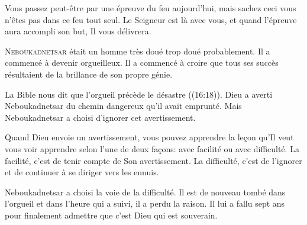 Vous passez peut-être par une épreuve du feu aujourd'hui, mais sachez ceci
 \ocadr vous n'êtes pas dans ce feu tout seul.
 Le Seigneur est là avec vous, et quand l'épreuve aura accompli son but,
 Il vous délivrera. 

\dvrule







\lettrine{N}{eboukadnetsar} était un homme très doué
 \ocadr trop doué probablement. Il a commencé à devenir orgueilleux.
 Il a commencé à croire que tous ses succès résultaient de la brillance
 de son propre génie. 

La Bible nous dit que \Og l'orgueil précède le désastre \Fg{}
 ((16:18)).
 Dieu a averti Neboukadnetsar du chemin dangereux qu'il avait emprunté.
 Mais Neboukadnetsar a choisi d'ignorer cet avertissement. 


Quand Dieu envoie un avertissement,
 vous pouvez apprendre la le\c{c}on
 qu'Il veut vous voir apprendre selon l'une de deux fa\c{c}ons:
 avec facilité ou avec difficulté. La facilité,
 c'est de tenir compte de Son avertissement. La difficulté,
 c'est de l'ignorer et de continuer à se diriger vers les ennuis. 

Neboukadnetsar a choisi la voie de la difficulté.
 Il est de nouveau tombé dans l'orgueil et dans l'heure qui a suivi,
 il a perdu la raison. Il lui a fallu sept ans pour finalement admettre
 que c'est Dieu qui est souverain. 

